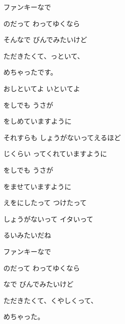 \documentclass[a4paper,tate,twocolumn,12pt]{ltjtarticle}
\begin{document}
\begin{flushleft}
\vspace{2em}

\noindent\begin{minipage}{\linewidth}
ファンキーなで

のだって わってゆくなら

そんなで びんでみたいけど

ただきたくて、っといて、

めちゃったです。

おしといてよ いといてよ
\end{minipage}

\vspace{2em}

\noindent\begin{minipage}{\linewidth}
をしでも うさが

をしめていますように

それすらも しょうがないってえるほど

じくらい ってくれていますように

をしでも うさが

をませていますように

えをにしたって つけたって

しょうがないって イタいって

るいみたいだね
\end{minipage}

\vspace{2em}

\noindent\begin{minipage}{\linewidth}
ファンキーなで

のだって わってゆくなら

なで びんでみたいけど

ただきたくて、くやしくって、

めちゃった。


\end{minipage}
\end{flushleft}
\end{document}
